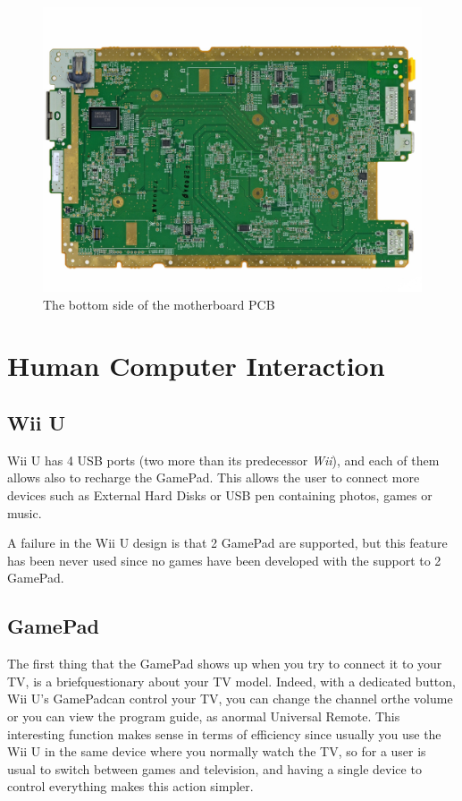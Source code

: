 \documentclass[11pt,a4paper,titlepage]{article}
\begin{document}
        \begin{figure}
          \centering
          \includegraphics[width = .8\textwidth]{motherboard_back.png}
          \caption{The bottom side of the motherboard PCB}
          \label{fig:motherboard_bottom}
        \end{figure}

	\section{Human Computer Interaction}
		\subsection{Wii U}
			Wii U has 4 USB ports (two more than its predecessor \textit{Wii}), and each of them allows also to recharge the GamePad. This allows the user to connect more devices such as External Hard Disks or USB pen containing photos, games or music.

			A failure in the Wii U design is that 2 GamePad are supported, but this feature has been never used since no games have been developed with the support to 2 GamePad.
		\subsection{GamePad}
			The first thing that the GamePad shows up when you try to connect it to your TV, is a briefquestionary about your TV model.
			Indeed, with a dedicated button, Wii U's GamePadcan control your TV, you can change the channel orthe volume or you can view the program guide, as anormal Universal Remote.
			This interesting function makes sense in terms of efficiency since usually you use the Wii U in the same device where you normally watch the TV, so for a user is usual to switch between games and television, and having a single device to control everything makes this action simpler.
\end{document}

